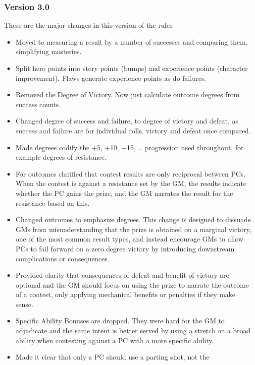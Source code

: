 \documentclass[
  11pt,
]{article}
\providecommand{\tightlist}{%
  \setlength{\itemsep}{0pt}\setlength{\parskip}{0pt}}
\begin{document}
\hypertarget{version-3.0}{%
\subsubsection{Version 3.0}\label{version-3.0}}

These are the major changes in this version of the rules

\begin{itemize}
\tightlist
\item
  Moved to measuring a result by a number of successes and comparing
  them, simplifying masteries.
\item
  Split hero points into story points (bumps) and experience points
  (character improvement). Flaws generate experience points as do
  failures.
\item
  Removed the Degree of Victory. Now just calculate outcome degrees from
  success counts.
\item
  Changed degree of success and failure, to degree of victory and
  defeat, as success and failure are for individual rolls, victory and
  defeat once compared.
\item
  Made degrees codify the +5, +10, +15, \ldots{} progression used
  throughout, for example degrees of resistance.
\item
  For outcomes clarified that contest results are only reciprocal
  between PCs. When the contest is against a resistance set by the GM,
  the results indicate whether the PC gains the prize, and the GM
  narrates the result for the resistance based on this.
\item
  Changed outcomes to emphasize degrees. This change is designed to
  dissuade GMs from misunderstanding that the prize is obtained on a
  marginal victory, one of the most common result types, and instead
  encourage GMs to allow PCs to fail forward on a zero degree victory by
  introducing downstream complications or consequences.
\item
  Provided clarity that consequences of defeat and benefit of victory
  are optional and the GM should focus on using the prize to narrate the
  outcome of a contest, only applying mechanical benefits or penalties
  if they make sense.
\item
  Specific Ability Bonuses are dropped. They were hard for the GM to
  adjudicate and the same intent is better served by using a stretch on
  a broad ability when contesting against a PC with a more specific
  ability.
\item
  Made it clear that only a PC should use a parting shot, not the

\end{itemize}
\end{document}
